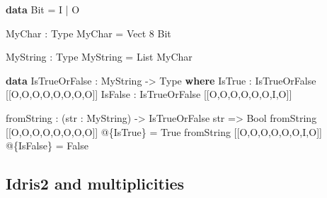 \documentclass[
]{article}
\newenvironment{Shaded}{}{}
\newcommand{\DataTypeTok}[1]{\textcolor[rgb]{0.56,0.13,0.00}{#1}}
\newcommand{\DecValTok}[1]{\textcolor[rgb]{0.25,0.63,0.44}{#1}}
\newcommand{\KeywordTok}[1]{\textcolor[rgb]{0.00,0.44,0.13}{\textbf{#1}}}
\newcommand{\NormalTok}[1]{#1}
\newcommand{\OperatorTok}[1]{\textcolor[rgb]{0.40,0.40,0.40}{#1}}
\newcommand{\OtherTok}[1]{\textcolor[rgb]{0.00,0.44,0.13}{#1}}
\begin{document}
\begin{Shaded}
\begin{Highlighting}[]
\KeywordTok{data} \DataTypeTok{Bit} \OtherTok{=} \DataTypeTok{I} \OperatorTok{|} \DataTypeTok{O}

\DataTypeTok{MyChar} \OperatorTok{:} \DataTypeTok{Type}
\DataTypeTok{MyChar} \OtherTok{=} \DataTypeTok{Vect} \DecValTok{8} \DataTypeTok{Bit}

\DataTypeTok{MyString} \OperatorTok{:} \DataTypeTok{Type}
\DataTypeTok{MyString} \OtherTok{=} \DataTypeTok{List} \DataTypeTok{MyChar}

\KeywordTok{data} \DataTypeTok{IsTrueOrFalse} \OperatorTok{:} \DataTypeTok{MyString} \OtherTok{{-}\textgreater{}} \DataTypeTok{Type} \KeywordTok{where}
  \DataTypeTok{IsTrue} \OperatorTok{:} \DataTypeTok{IsTrueOrFalse}\NormalTok{ [[}\DataTypeTok{O}\NormalTok{,}\DataTypeTok{O}\NormalTok{,}\DataTypeTok{O}\NormalTok{,}\DataTypeTok{O}\NormalTok{,}\DataTypeTok{O}\NormalTok{,}\DataTypeTok{O}\NormalTok{,}\DataTypeTok{O}\NormalTok{,}\DataTypeTok{O}\NormalTok{]]}
  \DataTypeTok{IsFalse} \OperatorTok{:} \DataTypeTok{IsTrueOrFalse}\NormalTok{ [[}\DataTypeTok{O}\NormalTok{,}\DataTypeTok{O}\NormalTok{,}\DataTypeTok{O}\NormalTok{,}\DataTypeTok{O}\NormalTok{,}\DataTypeTok{O}\NormalTok{,}\DataTypeTok{O}\NormalTok{,}\DataTypeTok{I}\NormalTok{,}\DataTypeTok{O}\NormalTok{]]}

\NormalTok{fromString }\OperatorTok{:}\NormalTok{ (str }\OperatorTok{:} \DataTypeTok{MyString}\NormalTok{) }\OtherTok{{-}\textgreater{}} \DataTypeTok{IsTrueOrFalse}\NormalTok{ str }\OtherTok{=\textgreater{}} \DataTypeTok{Bool}
\NormalTok{fromString [[}\DataTypeTok{O}\NormalTok{,}\DataTypeTok{O}\NormalTok{,}\DataTypeTok{O}\NormalTok{,}\DataTypeTok{O}\NormalTok{,}\DataTypeTok{O}\NormalTok{,}\DataTypeTok{O}\NormalTok{,}\DataTypeTok{O}\NormalTok{,}\DataTypeTok{O}\NormalTok{]] }\OperatorTok{@}\NormalTok{\{}\DataTypeTok{IsTrue}\NormalTok{\} }\OtherTok{=} \DataTypeTok{True}
\NormalTok{fromString [[}\DataTypeTok{O}\NormalTok{,}\DataTypeTok{O}\NormalTok{,}\DataTypeTok{O}\NormalTok{,}\DataTypeTok{O}\NormalTok{,}\DataTypeTok{O}\NormalTok{,}\DataTypeTok{O}\NormalTok{,}\DataTypeTok{I}\NormalTok{,}\DataTypeTok{O}\NormalTok{]] }\OperatorTok{@}\NormalTok{\{}\DataTypeTok{IsFalse}\NormalTok{\} }\OtherTok{=} \DataTypeTok{False}
\end{Highlighting}
\end{Shaded}

\hypertarget{idris2-and-multiplicities}{%
\subsection{Idris2 and multiplicities}\label{idris2-and-multiplicities}}
\end{document}
